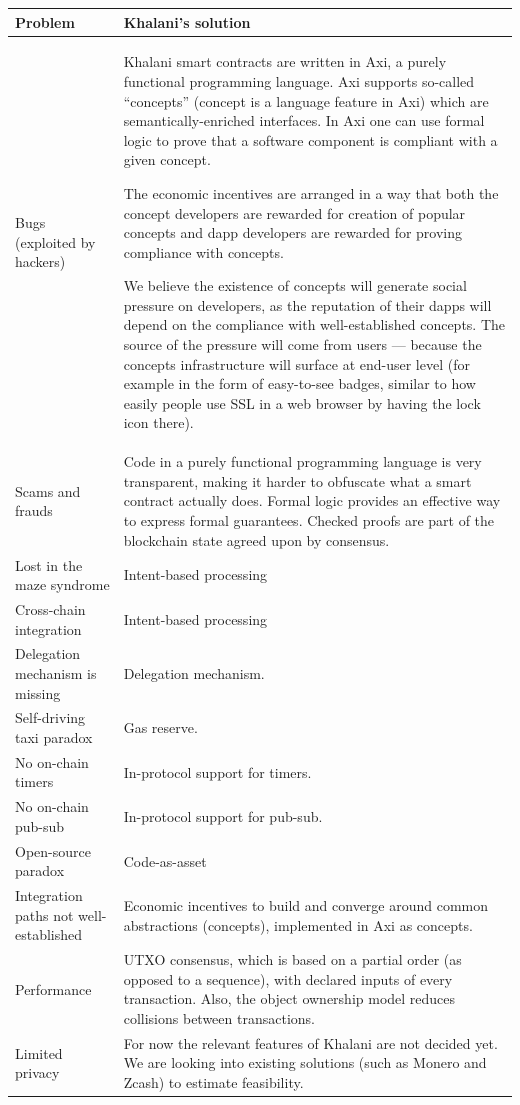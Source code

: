 \documentclass[a4paper]{article}
\begin{document}
\bigskip
\begin{tabularx}{\textwidth}{|l|X|}
\hline
\textbf{Problem} & \textbf{Khalani's solution} \\
\hline
Bugs (exploited by hackers) & Khalani smart contracts are written in Axi, a purely functional programming language. Axi supports so-called ``concepts'' (concept is a language feature in Axi) which are semantically-enriched interfaces. In Axi one can use formal logic to prove that a software component is compliant with a given concept.

The economic incentives are arranged in a way that both the concept developers are rewarded for creation of popular concepts and dapp developers are rewarded for proving compliance with concepts.

We believe the existence of concepts will generate social pressure on developers, as the reputation of their dapps will depend on the compliance with well-established concepts. The source of the pressure will come from users --- because the concepts infrastructure will surface at end-user level (for example in the form of easy-to-see badges, similar to how easily people use SSL in a web browser by having the lock icon there). \\
\hline
Scams and frauds & Code in a purely functional programming language is very transparent, making it harder to obfuscate what a smart contract actually does. Formal logic provides an effective way to express formal guarantees. Checked proofs are part of the blockchain state agreed upon by consensus. \\
\hline
Lost in the maze syndrome & Intent-based processing \\
\hline
Cross-chain integration & Intent-based processing \\
\hline
Delegation mechanism is missing & Delegation mechanism. \\
\hline
Self-driving taxi paradox & Gas reserve. \\
\hline
No on-chain timers & In-protocol support for timers. \\
\hline
No on-chain pub-sub & In-protocol support for pub-sub. \\
\hline
Open-source paradox & Code-as-asset \\
\hline
Integration paths not well-established & Economic incentives to build and converge around common abstractions (concepts), implemented in Axi as concepts. \\
\hline
Performance & UTXO consensus, which is based on a partial order (as opposed to a sequence), with declared inputs of every transaction. Also, the object ownership model reduces collisions between transactions. \\
\hline
Limited privacy & For now the relevant features of Khalani are not decided yet. We are looking into existing solutions (such as Monero and Zcash) to estimate feasibility. \\
\hline
\end{tabularx}
\bigskip
\end{document}
